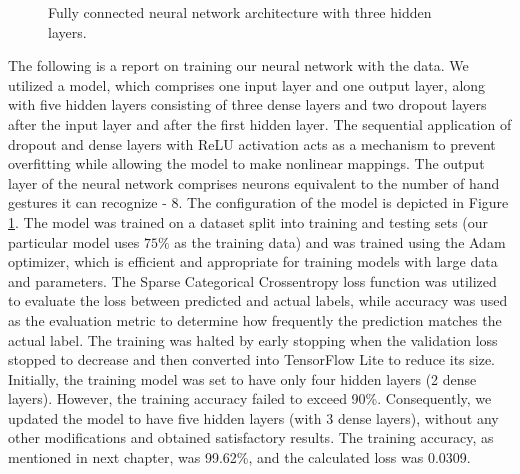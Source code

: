 \begin{figure}[ht!]
\begin{tikzpicture}
		
		
	\end{tikzpicture}
	\caption{ Fully connected neural network architecture with three hidden layers.}
	\label{fig:neural_network}
\end{figure}



The following is a report on training our neural network with the data. We utilized a model, which comprises one input layer and one output layer, along with five hidden layers consisting of three dense layers and two dropout layers after the input layer and after the first hidden layer. The sequential application of dropout and dense layers with ReLU activation acts as a mechanism to prevent overfitting while allowing the model to make nonlinear mappings. The output layer of the neural network comprises neurons equivalent to the number of hand gestures it can recognize - 8. The configuration of the model is depicted in Figure \ref{fig:neural_network}. The model was trained on a dataset split into training and testing sets (our particular model uses $75\%$ as the training data) and was trained using the Adam optimizer, which is efficient and appropriate for training models with large data and parameters. The Sparse Categorical Crossentropy loss function was utilized to evaluate the loss between predicted and actual labels, while accuracy was used as the evaluation metric to determine how frequently the prediction matches the actual label. The training was halted by early stopping when the validation loss stopped to decrease and then converted into TensorFlow Lite to reduce its size. Initially, the training model was set to have only four hidden layers (2 dense layers). However, the training accuracy failed to exceed 90\%. Consequently, we updated the model to have five hidden layers (with 3 dense layers), without any other modifications and obtained satisfactory results. The training accuracy, as mentioned in next chapter, was 99.62\%, and the calculated loss was 0.0309.





